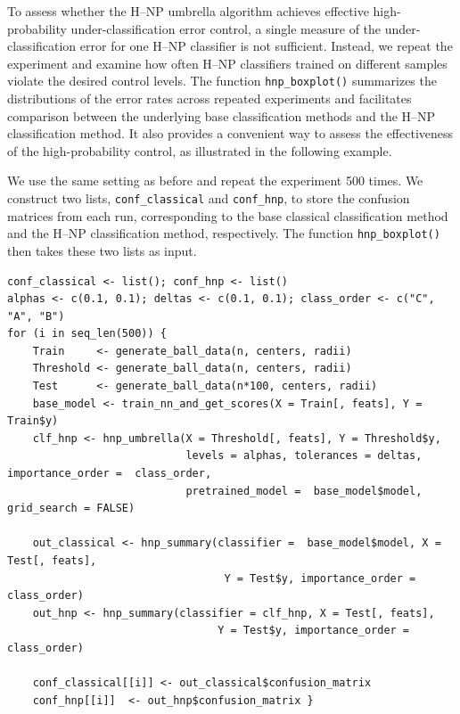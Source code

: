 To assess whether the H--NP umbrella algorithm achieves effective high-probability under-classification error control, a single measure of the under-classification error for one H--NP classifier is not sufficient. Instead, we repeat the experiment and examine how often H--NP classifiers trained on different samples violate the desired control levels. The function \texttt{hnp\_boxplot()} summarizes the distributions of the error rates across repeated experiments and facilitates comparison between the underlying base classification methods and the H--NP classification method. It also provides a convenient way to assess the effectiveness of the high-probability control, as illustrated in the following example.

We use the same setting as before and repeat the experiment 500 times. We construct two lists, \texttt{conf\_classical} and \texttt{conf\_hnp}, to store the confusion matrices from each run, corresponding to the base classical classification method and the H--NP classification method, respectively. The function \texttt{hnp\_boxplot()} then takes these two lists as input.
\begin{verbatim}
conf_classical <- list(); conf_hnp <- list()
alphas <- c(0.1, 0.1); deltas <- c(0.1, 0.1); class_order <- c("C", "A", "B")
for (i in seq_len(500)) {
    Train     <- generate_ball_data(n, centers, radii)
    Threshold <- generate_ball_data(n, centers, radii)
    Test      <- generate_ball_data(n*100, centers, radii)
    base_model <- train_nn_and_get_scores(X = Train[, feats], Y = Train$y)
    clf_hnp <- hnp_umbrella(X = Threshold[, feats], Y = Threshold$y,
                            levels = alphas, tolerances = deltas, importance_order =  class_order,
                            pretrained_model =  base_model$model, grid_search = FALSE)

    out_classical <- hnp_summary(classifier =  base_model$model, X = Test[, feats], 
                                  Y = Test$y, importance_order = class_order)
    out_hnp <- hnp_summary(classifier = clf_hnp, X = Test[, feats],
                                 Y = Test$y, importance_order = class_order)
        
    conf_classical[[i]] <- out_classical$confusion_matrix
    conf_hnp[[i]]  <- out_hnp$confusion_matrix }
\end{verbatim}



